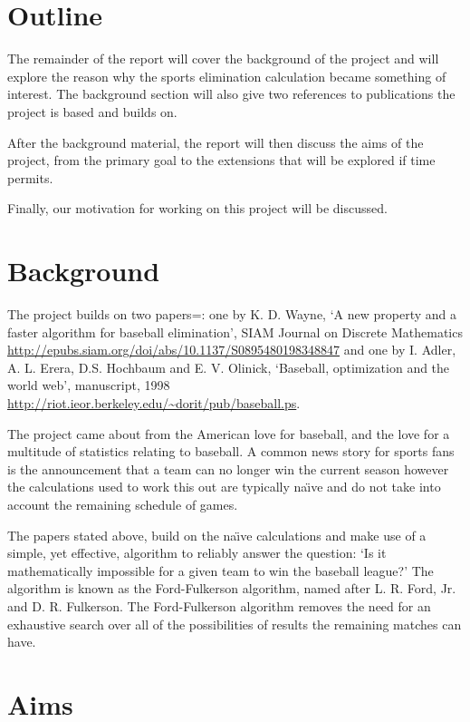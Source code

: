 \documentclass[11pt]{article}
\begin{document}
\section*{Outline}

The remainder of the report will cover the background of the project and will
explore the reason why the sports elimination calculation became something of
interest. The background section will also give two references to publications
the project is based and builds on.

After the background material, the report will then discuss the aims of the
project, from the primary goal to the extensions that will be explored if time
permits.

Finally, our motivation for working on this project will be discussed.

\section*{Background}

The project builds on two papers=: one by K. D. Wayne, `A new property and a 
faster algorithm for baseball elimination', SIAM Journal on Discrete 
Mathematics \url{http://epubs.siam.org/doi/abs/10.1137/S0895480198348847} and 
one by I. Adler, A. L. Erera, D.S. Hochbaum and E. V. Olinick, `Baseball,
optimization and the world web', manuscript, 1998
\url{http://riot.ieor.berkeley.edu/~dorit/pub/baseball.ps}.

The project came about from the American love for baseball, and the love for
a multitude of statistics relating to baseball. A common news story for sports
fans is the announcement that a team can no longer win the current season
however the calculations used to work this out are typically na\"{\i}ve and
do not take into account the remaining schedule of games.

The papers stated above, build on the na\"{\i}ve calculations and make use of a
simple, yet effective, algorithm to reliably answer the question:
`Is it mathematically impossible for a given team to win the baseball league?'
The algorithm is known as the Ford-Fulkerson algorithm, named after L. R. Ford,
Jr. and D. R. Fulkerson. The Ford-Fulkerson algorithm removes the need for an
exhaustive search over all of the possibilities of results the remaining
matches can have.

\section*{Aims}
\end{document}
